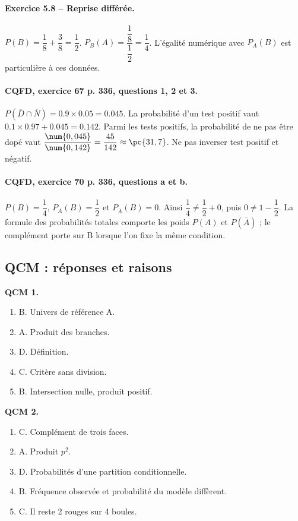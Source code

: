 \paragraph{Exercice 5.8 -- Reprise différée.} $P(B)=\dfrac{1}{8}+\dfrac{3}{8}=\dfrac{1}{2}$. $P_B(A)=\dfrac{\dfrac{1}{8}}{\dfrac{1}{2}}=\dfrac{1}{4}$. L’égalité numérique avec $P_A(B)$ est particulière à ces données.
\paragraph{CQFD, exercice 67 p. 336, questions 1, 2 et 3.} $P(\overline D\cap\overline N)=\num{0,9}\times\num{0,05}=\num{0,045}$. La probabilité d’un test positif vaut $\num{0,1}\times\num{0,97}+\num{0,045}=\num{0,142}$. Parmi les tests positifs, la probabilité de ne pas être dopé vaut $\dfrac{\num{0,045}}{\num{0,142}}=\dfrac{45}{142}\approx\pc{31,7}$. Ne pas inverser test positif et négatif.
\paragraph{CQFD, exercice 70 p. 336, questions a et b.} $P(B)=\dfrac14$, $P_A(B)=\dfrac12$ et $P_{\overline A}(B)=0$. Ainsi $\dfrac14\ne\dfrac12+0$, puis $0\ne1-\dfrac12$. La formule des probabilités totales comporte les poids $P(A)$ et $P(\overline A)$ ; le complément porte sur B lorsque l’on fixe la même condition.
\subsection*{QCM : réponses et raisons}
\textbf{QCM 1.}
\begin{enumerate}
\item B. Univers de référence A.
\item A. Produit des branches.
\item D. Définition.
\item C. Critère sans division.
\item B. Intersection nulle, produit positif.
\end{enumerate}
\textbf{QCM 2.}
\begin{enumerate}
\item C. Complément de trois faces.
\item A. Produit $p^2$.
\item D. Probabilités d’une partition conditionnelle.
\item B. Fréquence observée et probabilité du modèle diffèrent.
\item C. Il reste 2 rouges sur 4 boules.
\end{enumerate}
